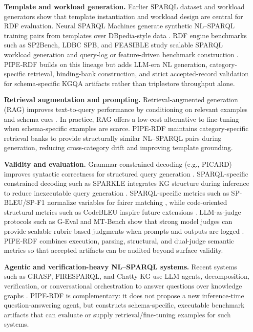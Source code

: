 \documentclass[11pt]{article}
\begin{document}
\textbf{Template and workload generation.} Earlier SPARQL dataset and workload generators show that template instantiation and workload design are central for RDF evaluation. Neural SPARQL Machines generate synthetic NL--SPARQL training pairs from templates over DBpedia-style data \citep{soru2017sparqlforeignlanguage}. RDF engine benchmarks such as SP2Bench, LDBC SPB, and FEASIBLE study scalable SPARQL workload generation and query-log or feature-driven benchmark construction \citep{schmidt2009sp2bench,ldbcspb,DBLP:conf/semweb/SaleemMN15}. PIPE-RDF builds on this lineage but adds LLM-era NL generation, category-specific retrieval, binding-bank construction, and strict accepted-record validation for schema-specific KGQA artifacts rather than triplestore throughput alone.

\textbf{Retrieval augmentation and prompting.} Retrieval-augmented generation (RAG) improves text-to-query performance by conditioning on relevant examples and schema cues \citep{lewis2021retrievalaugmentedgenerationknowledgeintensivenlp}. In practice, RAG offers a low-cost alternative to fine-tuning when schema-specific examples are scarce. PIPE-RDF maintains category-specific retrieval banks to provide structurally similar NL--SPARQL pairs during generation, reducing cross-category drift and improving template grounding.

\textbf{Validity and evaluation.} Grammar-constrained decoding (e.g., PICARD) improves syntactic correctness for structured query generation \citep{Scholak_2021}. SPARQL-specific constrained decoding such as SPARKLE integrates KG structure during inference to reduce inexecutable query generation \citep{lee2025sparkle}. SPARQL-specific metrics such as SP-BLEU/SP-F1 normalize variables for fairer matching \citep{Rony_2022}, while code-oriented structural metrics such as CodeBLEU inspire future extensions \citep{ren2020codebleumethodautomaticevaluation}. LLM-as-judge protocols such as G-Eval and MT-Bench show that strong model judges can provide scalable rubric-based judgments when prompts and outputs are logged \citep{liu-etal-2023-g,zheng2023mtbench}. PIPE-RDF combines execution, parsing, structural, and dual-judge semantic metrics so that accepted artifacts can be audited beyond surface validity.

\textbf{Agentic and verification-heavy NL--SPARQL systems.} Recent systems such as GRASP, FIRESPARQL, and Chatty-KG use LLM agents, decomposition, verification, or conversational orchestration to answer questions over knowledge graphs \citep{walter2025grasp,pan2025firesparql,omar2025chattykg}. PIPE-RDF is complementary: it does not propose a new inference-time question-answering agent, but constructs schema-specific, executable benchmark artifacts that can evaluate or supply retrieval/fine-tuning examples for such systems.
\end{document}
